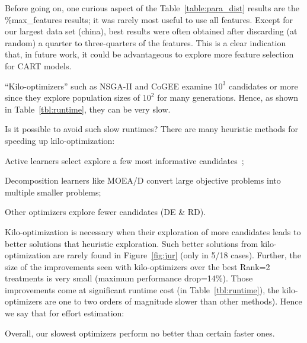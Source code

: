 Before going on, one curious aspect of the Table~\ref{table:para_dist} results are the 
\%max\_features results; it was rarely most useful to use all features. Except for our largest data set (china), best results were often obtained after discarding (at random) a quarter to three-quarters of the features. This is a clear indication that, in future work, it could be advantageous to explore more feature selection for CART models.

 
 


``Kilo-optimizers'' such as  NSGA-II and CoGEE examine $10^3$ candidates or more
since  they explore population sizes
of $10^2$ for many generations. Hence, as shown in Table~\ref{tbl:runtime},
they can be very slow.

Is it possible to avoid such slow runtimes?
There are many heuristic methods for speeding up
kilo-optimization:
\bi
\item Active learners  select explore a few most informative candidates~\cite{krall15};
\item Decomposition learners like MOEA/D  convert large
objective problems into multiple smaller problems;
\item
Other optimizers   explore   fewer candidates (DE \& RD).
\ei

Kilo-optimization is necessary when their exploration of  more candidates leads to better solutions that heuristic exploration.
Such better solutions from kilo-optimization are rarely found in Figure~\ref{fig:jur} (only in 5/18 cases). Further, the size of the improvements
seen with kilo-optimizers   over the best Rank=2 treatments is very small (maximum performance drop=14\%).
Those improvements come at significant runtime cost (in Table~\ref{tbl:runtime}), the kilo-optimizers
are one to two orders of magnitude slower than other methods). Hence we say that for effort estimation:

\begin{result}{3}
Overall,  our  slowest  optimizers  perform  no
better than certain faster ones.
 \end{result}
 
